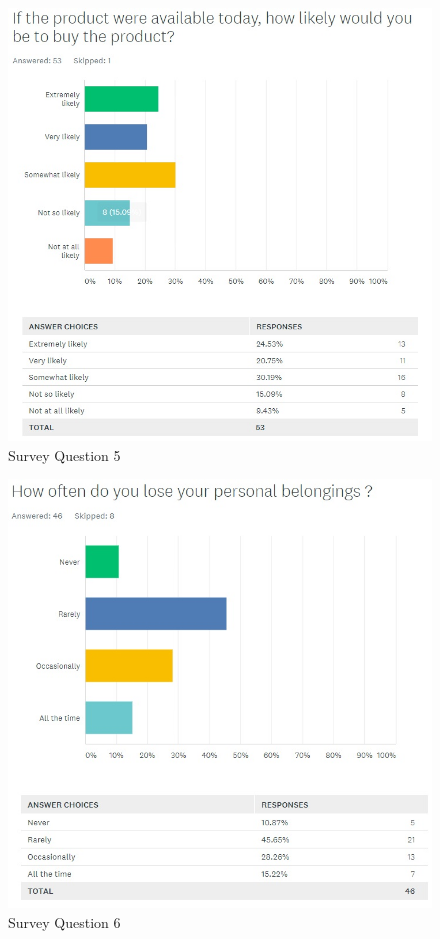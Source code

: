\documentclass[12pt,a4paper]{article}
\begin{document}
\begin{appendices}
        \begin{figure}[H]
          \centering
          \includegraphics[width=1\textwidth]{assets/12-2-survey-5.jpg}
          \caption{Survey Question 5}
          \label{fig:Survey Question 5}
        \end{figure}
      
        \begin{figure}[H]
          \centering
          \includegraphics[width=1\textwidth]{assets/12-2-survey-6.jpg}
          \caption{Survey Question 6}
          \label{fig:Survey Question 6}
        \end{figure}


\end{appendices}
\end{document}
